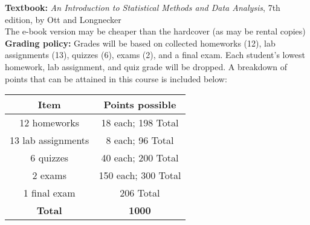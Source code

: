 \documentclass{article}
\begin{document}
\noindent\textbf{Textbook:}  \emph{An Introduction to Statistical Methods and Data Analysis}, 7th edition, by Ott and Longnecker\\
The e-book version may be cheaper than the hardcover (as may be rental copies) \\

\noindent\textbf{Grading policy:} 
Grades will be based on collected homeworks (12), lab assignments (13), quizzes (6), exams (2), and a final exam. Each student's lowest homework, lab assignment, and quiz grade will be dropped. A breakdown of points that can be attained in this course is included below:

\begin{center}
	\begin{tabular}{cc}
		\textbf{Item} & \textbf{Points possible} \\
		\hline
		12 homeworks & 18 each; 198 Total\\
		13 lab assignments & 8 each; 96 Total \\
		6 quizzes & 40 each; 200 Total \\
		2 exams & 150 each; 300 Total \\
		1 final exam & 206 Total \\
		\hline
		\textbf{Total} & \textbf{1000}\\
	\end{tabular}
\end{center}
\end{document}
